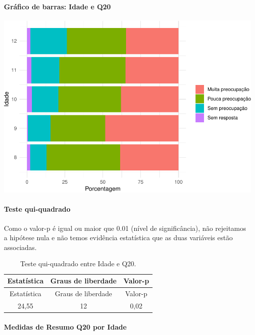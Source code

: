 \documentclass[]{article}
\let\oldparagraph\paragraph
\renewcommand{\paragraph}[1]{\oldparagraph{#1}\mbox{}}
\begin{document}
\hypertarget{gruxe1fico-de-barras-idade-e-q20}{%
\paragraph{Gráfico de barras: Idade e Q20}\label{gruxe1fico-de-barras-idade-e-q20}}

\begin{center}\includegraphics[width=0.75\linewidth]{relatorio_covid19_files/figure-latex/unnamed-chunk-388-1} \end{center}

\hypertarget{teste-qui-quadrado-34}{%
\paragraph{Teste qui-quadrado}\label{teste-qui-quadrado-34}}

Como o valor-p é igual ou maior que 0.01 (nível de significância), não rejeitamos a hipótese nula e não temos evidência estatística que as duas variáveis estão associadas.

\begin{longtable}[]{@{}ccc@{}}
\caption{\label{tab:unnamed-chunk-390}Teste qui-quadrado entre Idade e Q20.}\tabularnewline
\toprule
Estatística & Graus de liberdade & Valor-p\tabularnewline
\midrule
\endfirsthead
\toprule
Estatística & Graus de liberdade & Valor-p\tabularnewline
\midrule
\endhead
24,55 & 12 & 0,02\tabularnewline
\bottomrule
\end{longtable}

\cleardoublepage

\hypertarget{medidas-de-resumo-q20-por-idade}{%
\paragraph{Medidas de Resumo Q20 por Idade}\label{medidas-de-resumo-q20-por-idade}}
\end{document}
